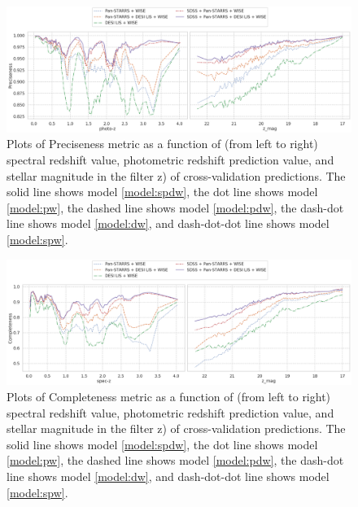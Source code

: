 \documentclass[fleqn,usenatbib]{mnras}
\begin{document}
\begin{figure}
    \centering
    \includegraphics[width=0.9\linewidth]{images/metrics-prec-cv2.png}
    \caption{Plots of Preciseness metric as a function of (from left to right) spectral redshift value, photometric redshift prediction value, and stellar magnitude in the filter z) of cross-validation predictions. The solid line shows model \ref{model:spdw}, the dot line shows model \ref{model:pw}, the dashed line shows model \ref{model:pdw}, the dash-dot line shows model \ref{model:dw}, and dash-dot-dot line shows model \ref{model:spw}.}
    \label{fig:metrics-prec-cv2-total}
\end{figure}

\begin{figure}
    \centering
    \includegraphics[width=0.9\linewidth]{images/metrics-comp-cv2.png}
    \caption{Plots of Completeness metric as a function of (from left to right) spectral redshift value, photometric redshift prediction value, and stellar magnitude in the filter z) of cross-validation predictions. The solid line shows model \ref{model:spdw}, the dot line shows model \ref{model:pw}, the dashed line shows model \ref{model:pdw}, the dash-dot line shows model \ref{model:dw}, and dash-dot-dot line shows model \ref{model:spw}.}
    \label{fig:metrics-comp-cv2-total}
\end{figure}
\end{document}
